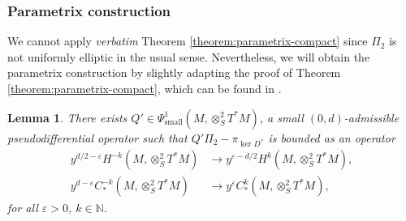\documentclass[10pt]{amsart}
\newcommand{\N}{\mathbb{N}}
\newcommand{\eps}{\varepsilon}
\theoremstyle{plain}
\newtheorem{lemma}{Lemma}[section]
\theoremstyle{definition}
\begin{document}
\subsubsection{Parametrix construction}

We cannot apply \emph{verbatim} Theorem \ref{theorem:parametrix-compact} since $\Pi_2$ is not uniformly elliptic in the usual sense. Nevertheless, we will obtain the parametrix construction by slightly adapting the proof of Theorem \ref{theorem:parametrix-compact}, which can be found in \cite[\S 4.2.3]{Bonthonneau-Lefeuvre-19-1}.

\begin{lemma}
\label{lemma:parametrix}
There exists $Q' \in \Psi^1_{\mathrm{small}}(M,\otimes^2_S T^*M)$, a small $(0,d)$-admissible pseudodifferential operator such that $Q'\Pi_2-\pi_{\ker D^*}$ is bounded as an operator
\[
\begin{split}
y^{d/2-\eps}H^{-k}(M,\otimes^2_S T^*M) &\to y^{\eps-d/2}H^{k}(M,\otimes^2_S T^*M), \\
y^{d-\eps}C^{-k}_*(M,\otimes^2_S T^*M) &\to y^{\eps}C^{k}_*(M,\otimes^2_S T^*M),
\end{split}
\]
for all $\eps > 0$, $k \in \N$.
\end{lemma}
\end{document}
